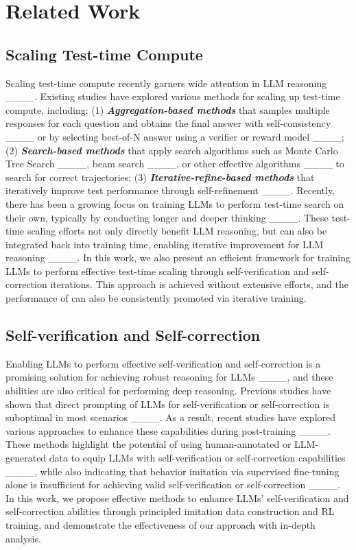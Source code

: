 \section{Related Work}
\subsection{Scaling Test-time Compute}
Scaling test-time compute recently garners wide attention in LLM reasoning ____. Existing studies have explored various methods for scaling up test-time compute, including: (1) \textbf{\textit{Aggregation-based methods}} that samples multiple responses for each question and obtains the final answer with self-consistency ____ or by selecting best-of-N answer using a verifier or reward model ____; (2) \textit{\textbf{Search-based methods}} that apply search algorithms such as Monte Carlo Tree Search ____, beam search ____, or other effective algorithms ____ to search for correct trajectories; (3) \textit{\textbf{Iterative-refine-based  methods}} that iteratively improve test performance through self-refinement ____. Recently, there has been a growing focus on training LLMs to perform test-time search on their own, typically by conducting longer and deeper thinking ____. 
These test-time scaling efforts not only directly benefit LLM reasoning, but can also be integrated back into training time, enabling iterative improvement for LLM reasoning ____. 
In this work, we also present an efficient framework for training LLMs to perform effective test-time scaling through self-verification and self-correction iterations. This approach is achieved without extensive efforts, and the performance of \modelx can also be consistently promoted via iterative training.

\subsection{Self-verification and Self-correction}
Enabling LLMs to perform effective self-verification and self-correction is a promising solution for achieving robust reasoning for LLMs ____, and these abilities are also critical for performing deep reasoning.
Previous studies have shown that direct prompting of LLMs for self-verification or self-correction is suboptimal in most scenarios ____. As a result, recent studies have explored various approaches to enhance these capabilities during post-training ____. These methods highlight the potential of using human-annotated or LLM-generated data to equip LLMs with self-verification or self-correction capabilities ____, while also indicating that behavior imitation via supervised fine-tuning alone is insufficient for achieving valid self-verification or self-correction  ____. In this work, we propose effective methods to enhance LLMs' self-verification and self-correction abilities through principled imitation data construction and RL training, and demonstrate the effectiveness of our approach with in-depth analysis.





